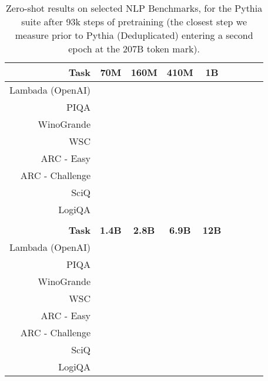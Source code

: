 \documentclass{article}
\theoremstyle{plain}
\theoremstyle{definition}
\theoremstyle{remark}
\begin{document}
\begin{table}[H]
\centering
\begin{tabular}{rcccccccc}
\toprule
\textbf{Task} & \textbf{70M} & \textbf{160M} & \textbf{410M} & \textbf{1B} \\
\midrule
Lambada (OpenAI) &  &  &  &  \\
PIQA &  &  &  &  \\
WinoGrande &  &  &  &  \\
WSC &  &  &  &  \\
ARC - Easy &  &  &  & \\
ARC - Challenge &  &  &  &  \\
SciQ &  &  &  &  \\
LogiQA &  &  &  &  \\
\bottomrule
\\
\textbf{Task} & \textbf{1.4B} & \textbf{2.8B} & \textbf{6.9B} & \textbf{12B} \\
\midrule
Lambada (OpenAI) &  &  &  &  \\
PIQA &  &  &  &  \\
WinoGrande &  &  &  &  \\
WSC &  &  &  &  \\
ARC - Easy &  &  &  &  \\
ARC - Challenge &  &  &  &  \\
SciQ &  &  &  &  \\
LogiQA &  &  &  &  \\
\bottomrule
\end{tabular}
\caption{Zero-shot results on selected NLP Benchmarks, for the Pythia suite after 93k steps of pretraining (the closest step we measure prior to Pythia (Deduplicated) entering a second epoch at the 207B token mark).}
\end{table}
\end{document}
